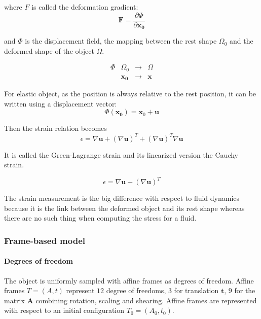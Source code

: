 \documentclass[11pt, oneside, a4paper]{memoir}
\begin{document}
where $F$ is called the deformation gradient:
\begin{equation}
\mathbf{F} = \frac{\partial \Phi}{\partial \mathbf{x_{0}}}
\end{equation}

and $\Phi$ is the displacement field, the mapping between the rest shape $\Omega_{0}$ and the deformed shape of the object $\Omega$. 

\begin{equation}
\begin{array}{llll}
\Phi & \Omega_{0} & \longrightarrow & \Omega \\
	 & \mathbf{x_{0}} & \longrightarrow & \mathbf{x}
\end{array}
\end{equation}

For elastic object, as the position is always relative to the rest position, it can be written using a displacement vector:
\begin{equation}
\Phi(\mathbf{x_{0}}) = \mathbf{x}_{0} + \mathbf{u}
\end{equation}

Then the strain relation becomes
\begin{equation}
\epsilon = \nabla \mathbf{u} + \left( \nabla \mathbf{u} \right)^{T} + \left(\nabla \mathbf{u}\right)^{T}\nabla \mathbf{u}
\end{equation}

It is called the Green-Lagrange strain and its linearized version the Cauchy strain.

\begin{equation}
\epsilon = \nabla \mathbf{u} + \left( \nabla \mathbf{u} \right)^{T}
\end{equation}

The strain measurement is the big difference with respect to fluid dynamics because it is the link between the deformed object and its rest shape whereas there are no such thing when computing the stress for a fluid.

\subsubsection{Frame-based model}

\paragraph{Degrees of freedom}
The object is uniformly sampled with affine frames as degrees of freedom. Affine frames $T=(A,t)$ represent $12$ degree of freedoms, $3$ for translation $\mathbf{t}$, $9$ for the matrix $\mathbf{A}$ combining rotation, scaling and shearing. Affine frames are represented with respect to an initial configuration $T_{0} = \left(A_{0}, t_{0}\right)$.
\end{document}
